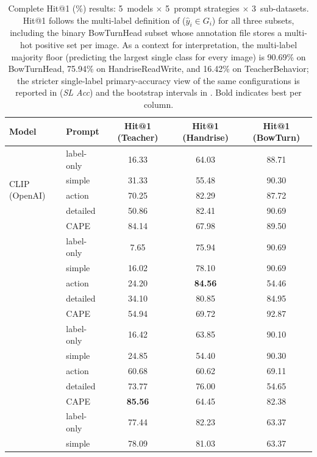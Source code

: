 \documentclass[electronics,article,submit,pdftex,moreauthors]{Definitions/mdpi}
\begin{document}
\begin{table}[H]
\caption{Complete Hit@1 (\%) results: 5~models $\times$ 5~prompt strategies $\times$ 3~sub-datasets. Hit@1 follows the multi-label definition of  ($\hat{y}_i \in G_i$) for all three subsets, including the binary BowTurnHead subset whose annotation file stores a multi-hot positive set per image. As a context for interpretation, the multi-label majority floor (predicting the largest single class for every image) is 90.69\% on BowTurnHead, 75.94\% on HandriseReadWrite, and 16.42\% on TeacherBehavior; the stricter single-label primary-accuracy view of the same configurations is reported in  (\textit{SL Acc}) and the bootstrap intervals in . Bold indicates best per column.}
\label{tab:main_results}
\centering
\small
\setlength{\tabcolsep}{4pt}
\begin{tabular}{ll ccc}
\toprule
\textbf{Model} & \textbf{Prompt} & \textbf{Hit@1 (Teacher)} & \textbf{Hit@1 (Handrise)} & \textbf{Hit@1 (BowTurn)} \\
\midrule
\multirow{5}{*}{CLIP (OpenAI)}
 & label-only & 16.33 & 64.03 & 88.71 \\
 & simple & 31.33 & 55.48 & 90.30 \\
 & action & 70.25 & 82.29 & 87.72 \\
 & detailed & 50.86 & 82.41 & 90.69 \\
 & CAPE & 84.14 & 67.98 & 89.50 \\
\addlinespace
\multirow{5}{*}{OpenCLIP (LAION)}
 & label-only & 7.65 & 75.94 & 90.69 \\
 & simple & 16.02 & 78.10 & 90.69 \\
 & action & 24.20 & \textbf{84.56} & 54.46\rlap{$^{\ddagger}$} \\
 & detailed & 34.10 & 80.85 & 84.95 \\
 & CAPE & 54.94 & 69.72 & 92.87 \\
\addlinespace
\multirow{5}{*}{SigLIP2}
 & label-only & 16.42\rlap{$^{\S}$} & 63.85 & 90.10 \\
 & simple & 24.85 & 54.40 & 90.30 \\
 & action & 60.68 & 60.62 & 69.11 \\
 & detailed & 73.77 & 76.00 & 54.65 \\
 & CAPE & \textbf{85.56} & 64.45 & 82.38 \\
\addlinespace
\multirow{5}{*}{EVA02-CLIP}
 & label-only & 77.44 & 82.23 & 63.37 \\
 & simple & 78.09 & 81.03 & 63.37 \\

\end{tabular}
\end{table}
\end{document}
